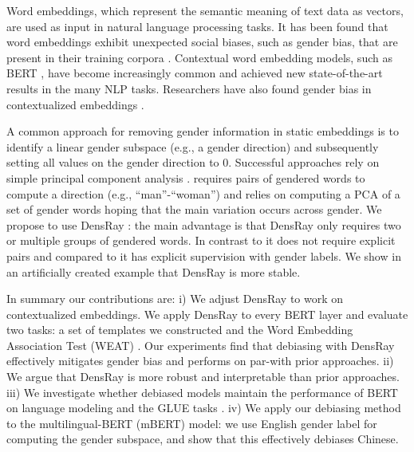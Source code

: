 Word embeddings, which represent the semantic meaning of text data as vectors, are used as input in natural language processing tasks. It has been found that word embeddings exhibit unexpected social biases, such as gender bias, that are present in their training corpora \citep{bolukbasi2016man, caliskan2017semantics,garg2018word}. Contextual word embedding models, such as BERT \citep{devlin2018bert}, have become increasingly common and achieved new state-of-the-art results in the many NLP tasks. Researchers have also found gender bias in contextualized embeddings \citep{zhao2019gender,may2019measuring}.

A common approach for removing gender information in static embeddings is to identify a linear gender subspace (e.g., a gender direction) and subsequently setting all values on the gender direction to 0. Successful approaches rely on simple principal component analysis \cite{bolukbasi2016man,mu2018all}. \citet{bolukbasi2016man} requires pairs of gendered words to compute a direction (e.g., ``man''-``woman'') and \citet{mu2018all} relies on computing a PCA of a set of gender words hoping that the main variation occurs across gender. We propose to use DensRay \citep{dufter2019analytical}: the main advantage is that DensRay only requires two or multiple groups of gendered words. In contrast to \cite{bolukbasi2016man} it does not require explicit pairs and compared to \cite{mu2018all} it has explicit supervision with gender labels. We show in an artificially created example that DensRay is more stable. 

In summary our contributions are: i) We adjust DensRay to work on contextualized embeddings. 
 We apply DensRay to every BERT layer and evaluate two tasks: a set of templates we constructed and the Word Embedding Association Test (WEAT) \citep{caliskan2017semantics}. Our experiments find that debiasing with DensRay effectively mitigates gender bias and performs on par-with prior approaches. ii) We argue that DensRay is more robust and interpretable than prior approaches.
iii) We investigate whether debiased models maintain the performance of BERT on language modeling and the GLUE tasks \citep{wang2018glue}. iv) We apply our debiasing method to the multilingual-BERT (mBERT) model: we use English gender label for computing the gender subspace, and show that this effectively debiases Chinese. 

